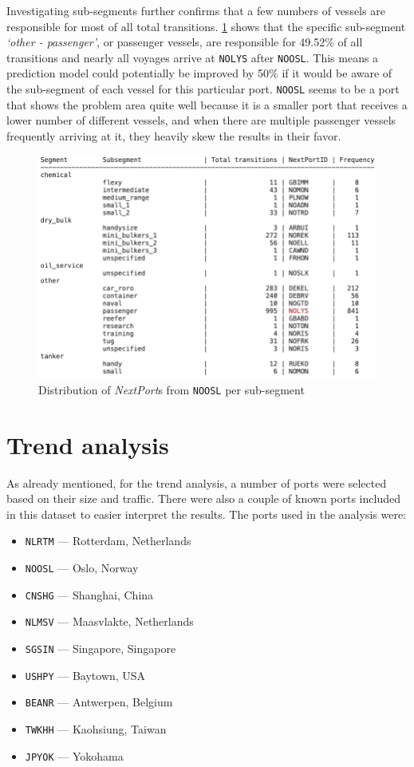 Investigating sub-segments further confirms that a few numbers of vessels are responsible for most of all total transitions. \cref{fig:apw_noosl_subsegments} shows that the specific sub-segment \textit{`other - passenger'}, or passenger vessels, are responsible for 49.52\% of all transitions and nearly all voyages arrive at \texttt{NOLYS} after \texttt{NOOSL}. This means a prediction model could potentially be improved by 50\% if it would be aware of the sub-segment of each vessel for this particular port. \texttt{NOOSL} seems to be a port that shows the problem area quite well because it is a smaller port that receives a lower number of different vessels, and when there are multiple passenger vessels frequently arriving at it, they heavily skew the results in their favor.%

\begin{figure}[htbp]
    \centering
    \includegraphics[width=.8\textwidth]{figures/apw/noosl_subsegments.png}
    \caption{Distribution of \textit{NextPort}s from \texttt{NOOSL} per sub-segment}
    \label{fig:apw_noosl_subsegments}
\end{figure}


\section{Trend analysis}
\label{sec:trend_analysis}

As already mentioned, for the trend analysis, a number of ports were selected based on their size and traffic. There were also a couple of known ports included in this dataset to easier interpret the results. The ports used in the analysis were:

\begin{itemize}
    \item \texttt{NLRTM} --- Rotterdam, Netherlands
    \item \texttt{NOOSL} --- Oslo, Norway
    \item \texttt{CNSHG} --- Shanghai, China
    \item \texttt{NLMSV} --- Maasvlakte, Netherlands
    \item \texttt{SGSIN} --- Singapore, Singapore
    \item \texttt{USHPY} --- Baytown, USA
    \item \texttt{BEANR} --- Antwerpen, Belgium
    \item \texttt{TWKHH} --- Kaohsiung, Taiwan
    \item \texttt{JPYOK} --- Yokohama
\end{itemize}

